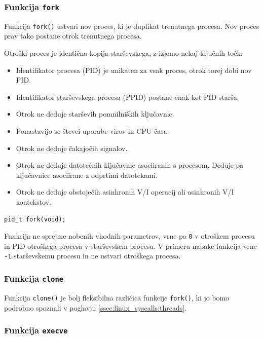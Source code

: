 \documentclass[a4paper,12pt,openright]{book}
\begin{document}
\subsubsection{Funkcija \texttt{fork}}

Funkcija \texttt{fork()} ustvari nov proces, ki je duplikat trenutnega procesa.
Nov proces prav tako postane otrok trenutnega procesa.

Otroški proces je identična kopija starševskega, z izjemo nekaj ključnih točk:
\begin{itemize}
	\item Identifikator procesa (PID) je unikaten za vsak proces, otrok torej dobi nov PID.
	\item Identifikator starševskega procesa (PPID) postane enak kot PID starša.
	\item Otrok ne deduje starševih pomnilniških ključavnic.
	\item Ponastavijo se števci uporabe virov in CPU časa.
	\item Otrok ne deduje čakajočih signalov.
	\item Otrok ne deduje datotečnih ključavnic asociiranih s procesom. Deduje pa ključavnice asociirane z odprtimi datotekami.
	\item Otrok ne deduje obstoječih asinhronih V/I operacij ali asinhronih V/I kontekstov.
\end{itemize}

\begin{lstlisting}[style=func]
 pid_t fork(void);
\end{lstlisting}

Funkcija ne sprejme nobenih vhodnih parametrov, vrne pa \texttt{0} v otroškem procesu in PID otroškega procesa v starševskem procesu.
V primeru napake funkcija vrne \texttt{-1} starševskemu procesu in ne ustvari otroškega procesa.

\subsubsection{Funkcija \texttt{clone}}

Funkcija \texttt{clone()} je bolj fleksibilna različica funkcije \texttt{fork()}, ki jo bomo podrobno spoznali v poglavju \ref{ssec:linux_syscalls:threads}.

\subsubsection{Funkcija \texttt{execve}}
\end{document}
